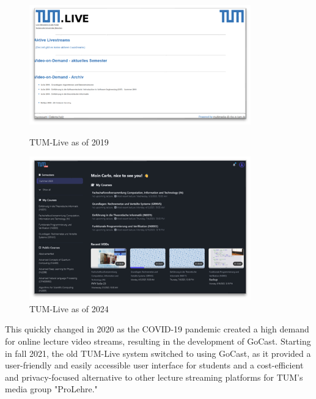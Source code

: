 \begin{figure}[htpb]
    \centering
    \begin{minipage}{0.49\linewidth}
        \centering
        \includegraphics[width=\linewidth]{images/TUMLive2019.png}
        \caption[TUM-Live as of 2019]{TUM-Live as of 2019\footnotemark[9]}
        \label{fig:tumlive-2019}
    \end{minipage}
    \hfill
    \begin{minipage}{0.49\linewidth}
        \centering
        \includegraphics[width=\linewidth]{images/TUMLive2024.png}
        \caption[TUM-Live as of 2024]{TUM-Live as of 2024\footnotemark[10]}
        \label{fig:tumlive-2024}
    \end{minipage}
\end{figure}

\noindent This quickly changed in 2020 as the COVID-19 pandemic created a high demand for online lecture video streams, resulting in the development of GoCast. Starting in fall 2021, the old TUM-Live system switched to using GoCast, as it provided a user-friendly and easily accessible user interface for students and a cost-efficient and privacy-focused alternative to other lecture streaming platforms for \ac{TUM}'s media group "ProLehre." 

